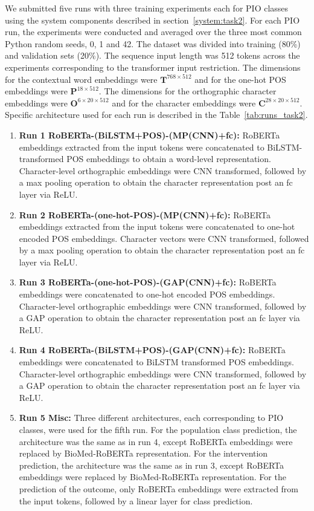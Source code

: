 \documentclass[11pt]{article}
\begin{document}
We submitted five runs with three training experiments each for PIO classes using the system components described in section~\ref{system:task2}.
For each PIO run, the experiments were conducted and averaged over the three most common Python random seeds, 0, 1 and 42.
The dataset was divided into training (80\%) and validation sets (20\%).
The sequence input length was 512 tokens across the experiments corresponding to the transformer input restriction.
The dimensions for the contextual word embeddings were $\mathbf{T}^{768 \times 512}$ and for the one-hot POS embeddings were $\mathbf{P}^{18 \times 512}$.
The dimensions for the orthographic character embeddings were $\mathbf{O}^{6 \times 20 \times 512}$ and for the character embeddings were $\mathbf{C}^{28 \times 20 \times 512}$.
Specific architecture used for each run is described in the Table~\ref{tab:runs_task2}.
%
\begin{enumerate}
    \item \textbf{Run 1 RoBERTa-(BiLSTM+POS)-(MP(CNN)+fc): } RoBERTa embeddings extracted from the input tokens were concatenated to BiLSTM-transformed POS embeddings to obtain a word-level representation. Character-level orthographic embeddings were CNN transformed, followed by a max pooling operation to obtain the character representation post an fc layer via ReLU.
    \item \textbf{Run 2 RoBERTa-(one-hot-POS)-(MP(CNN)+fc): } RoBERTa embeddings extracted from the input tokens were concatenated to one-hot encoded POS embeddings. Character vectors were CNN transformed, followed by a max pooling operation to obtain the character representation post an fc layer via ReLU.
   \item \textbf{Run 3 RoBERTa-(one-hot-POS)-(GAP(CNN)+fc): } RoBERTa embeddings were concatenated to one-hot encoded POS embeddings. Character-level orthographic embeddings were CNN transformed, followed by a GAP operation to obtain the character representation post an fc layer via ReLU.
   \item \textbf{Run 4 RoBERTa-(BiLSTM+POS)-(GAP(CNN)+fc): } RoBERTa embeddings were concatenated to BiLSTM transformed POS embeddings. Character-level orthographic embeddings were CNN transformed, followed by a GAP operation to obtain the character representation post an fc layer via ReLU.
    \item \textbf{Run 5 Misc:} Three different architectures, each corresponding to PIO classes, were used for the fifth run. For the population class prediction, the architecture was the same as in run 4, except RoBERTa embeddings were replaced by BioMed-RoBERTa representation. For the intervention prediction, the architecture was the same as in run 3, except RoBERTa embeddings were replaced by BioMed-RoBERTa representation. For the prediction of the outcome, only RoBERTa embeddings were extracted from the input tokens, followed by a linear layer for class prediction. 
\end{enumerate}
\end{document}
